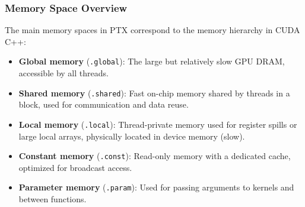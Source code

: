\subsubsection{Memory Space Overview}

The main memory spaces in PTX correspond to the memory hierarchy in CUDA C++:

\begin{itemize}
    \item \textbf{Global memory} (\texttt{.global}): The large but relatively slow GPU DRAM, accessible by all threads.
    
    \item \textbf{Shared memory} (\texttt{.shared}): Fast on-chip memory shared by threads in a block, used for communication and data reuse.
    
    \item \textbf{Local memory} (\texttt{.local}): Thread-private memory used for register spills or large local arrays, physically located in device memory (slow).
    
    \item \textbf{Constant memory} (\texttt{.const}): Read-only memory with a dedicated cache, optimized for broadcast access.
    
    \item \textbf{Parameter memory} (\texttt{.param}): Used for passing arguments to kernels and between functions.
\end{itemize}


